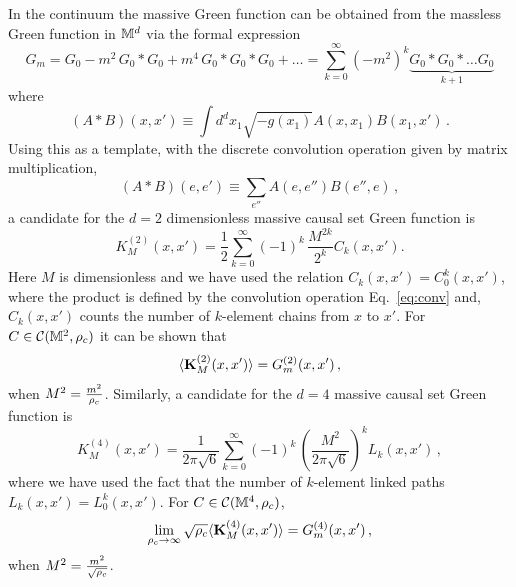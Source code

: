 In the continuum the massive Green function can be
obtained from the massless Green function in $\mathbb M^d$ via the formal expression \citep{dsx} 
\begin{equation} 
\label{eq:conv} 
G_m=G_0 - m^2\,G_0*G_0 + m^4 \,G_0*G_0*G_0+ \ldots = \sum_{k=0}^\infty(-m^2)^k \underbrace{G_0 * G_0* \ldots G_0}_{k+1}
\end{equation}
where 
\begin{equation}
(A\ast B)(x,x')\equiv \int d^dx_1 \sqrt{-g(x_1)} A(x,x_1)
B(x_1,x')\,.
\label{eq:conv}
\end{equation}  
Using this as a template, with the discrete convolution operation given by  matrix multiplication,  
\begin{equation}
(A \ast B)(e,e')\equiv  \sum_{e''} A(e,e'') B(e'',e)\, , 
\end{equation}  
a candidate for the  $d=2$ dimensionless massive causal set Green function is 
\begin{equation}
\label{eq:2dGf} 
K^{(2)}_M(x,x') =  \frac{1}{2} \sum\limits_{k=0}^\infty (-1)^k \, \frac{M^{2k} }{2^k}  C_k(x,x').   
\end{equation} 
Here $M$ is dimensionless and  we have used the relation $C_k(x,x')=C_0^k(x,x')$, where the product is defined by the
convolution operation Eq.~\ref{eq:conv} and, $C_k(x,x')$ counts the number of
$k$-element chains from $x$ to $x'$.  For $C \in \mathcal C(\mathbb M^2, \rho_c)$  it can  be shown
that \citep{johnston,johnstonthesis}  
\begin{equation} 
\langle {{\mathbf K}^{(2)}_M(x,x')} \rangle = G^{(2)}_m(x,x') \label{proof3}\,, 
\end{equation} 
when $M^2=\frac{m^2}{\rho_c}$.  
Similarly, a candidate for the $d=4$ massive causal set Green function is 
\begin{equation}
\label{eq:4dGF}
K^{(4)}_M(x,x') =  \frac{1}{2\pi\sqrt{6}} \sum\limits_{k=0}^\infty
(-1)^k \, \left(\frac{M^2}{2\pi\sqrt{6}}\right)^{k} L_k(x,x')\, ,
\end{equation} 
where we have used the fact that the number of $k$-element linked paths $L_k(x,x')=L_0^k(x,x')$. For  $C \in \mathcal C(\mathbb M^4,\rho_c)$, 
\begin{equation} 
\lim_{\rho_c \rightarrow \infty} \sqrt{\rho_c} \langle {{\mathbf K}^{(4)}_M(x,x')} \rangle = G^{(4)}_m(x,x')\,, 
\end{equation} 
when  $M^2=\frac{m^2}{\sqrt{\rho_c}}$. 

